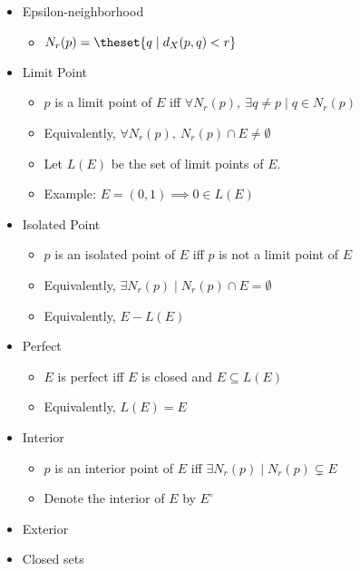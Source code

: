 \begin{itemize}
\item
  Epsilon-neighborhood

  \begin{itemize}
  \tightlist
  \item
    \(N_r(p) = \theset{q \mid d_X(p,q) < r}\)
  \end{itemize}
\item
  Limit Point

  \begin{itemize}
  \tightlist
  \item
    \(p\) is a limit point of \(E\) iff
    \(\forall N_r(p),~ \exists q\neq p \mid q \in N_r(p)\)
  \item
    Equivalently, \(\forall N_r(p),~ N_r(p) \cap E \neq \emptyset\)
  \item
    Let \(L(E)\) be the set of limit points of \(E\).
  \item
    Example: \(E = (0,1) \implies 0 \in L(E)\)
  \end{itemize}
\item
  Isolated Point

  \begin{itemize}
  \tightlist
  \item
    \(p\) is an isolated point of \(E\) iff \(p\) is not a limit point
    of \(E\)
  \item
    Equivalently, \(\exists N_r(p) \mid N_r(p) \cap E = \emptyset\)
  \item
    Equivalently, \(E - L(E)\)
  \end{itemize}
\item
  Perfect

  \begin{itemize}
  \tightlist
  \item
    \(E\) is perfect iff \(E\) is closed and \(E \subseteq L(E)\)
  \item
    Equivalently, \(L(E) = E\)
  \end{itemize}
\item
  Interior

  \begin{itemize}
  \tightlist
  \item
    \(p\) is an interior point of \(E\) iff
    \(\exists N_r(p) \mid N_r(p) \subsetneq E\)
  \item
    Denote the interior of \(E\) by \(E^\circ\)
  \end{itemize}
\item
  Exterior
\item
  Closed sets


\end{itemize}

